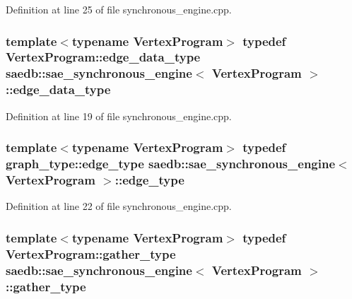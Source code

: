 Definition at line 25 of file synchronous\-\_\-engine.\-cpp.

\hypertarget{classsaedb_1_1sae__synchronous__engine_a1dc041ad51a5c58fc1a2b58b962069f7}{
\subsubsection[{edge\-\_\-data\-\_\-type}]{\setlength{\rightskip}{0pt plus 5cm}template$<$typename Vertex\-Program$>$ typedef Vertex\-Program\-::edge\-\_\-data\-\_\-type {\bf saedb\-::sae\-\_\-synchronous\-\_\-engine}$<$ Vertex\-Program $>$\-::{\bf edge\-\_\-data\-\_\-type}}}\label{d7/d39/classsaedb_1_1sae__synchronous__engine_a1dc041ad51a5c58fc1a2b58b962069f7}


Definition at line 19 of file synchronous\-\_\-engine.\-cpp.

\hypertarget{classsaedb_1_1sae__synchronous__engine_afc24e00d4e98d9bc1b8b6634d94f13e8}{
\subsubsection[{edge\-\_\-type}]{\setlength{\rightskip}{0pt plus 5cm}template$<$typename Vertex\-Program$>$ typedef {\bf graph\-\_\-type\-::edge\-\_\-type} {\bf saedb\-::sae\-\_\-synchronous\-\_\-engine}$<$ Vertex\-Program $>$\-::{\bf edge\-\_\-type}}}\label{d7/d39/classsaedb_1_1sae__synchronous__engine_afc24e00d4e98d9bc1b8b6634d94f13e8}


Definition at line 22 of file synchronous\-\_\-engine.\-cpp.

\hypertarget{classsaedb_1_1sae__synchronous__engine_a93815ca5d2b8fb54e1dbeda9595e852f}{
\subsubsection[{gather\-\_\-type}]{\setlength{\rightskip}{0pt plus 5cm}template$<$typename Vertex\-Program$>$ typedef Vertex\-Program\-::gather\-\_\-type {\bf saedb\-::sae\-\_\-synchronous\-\_\-engine}$<$ Vertex\-Program $>$\-::{\bf gather\-\_\-type}}}\label{d7/d39/classsaedb_1_1sae__synchronous__engine_a93815ca5d2b8fb54e1dbeda9595e852f}


